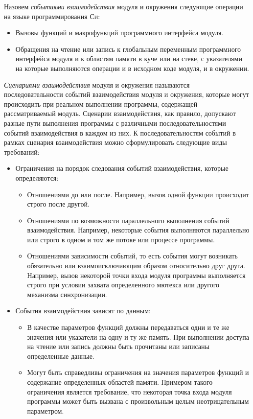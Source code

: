Назовем \textit{событиями взаимодействия} модуля и окружения следующие операции на языке программирования Си:
\begin{itemize}
    \item Вызовы функций и макрофункций программного интерфейса модуля.
    \item Обращения на чтение или запись к глобальным переменным программного интерфейса модуля и к областям памяти в куче или на стеке, с указателями на которые выполняются операции и в исходном коде модуля, и в окружении.
\end{itemize}

\textit{Сценариями взаимодействия} модуля и окружения называются последовательности событий взаимодействия модуля и окружения, которые могут происходить при реальном выполнении программы, содержащей рассматриваемый модуль.
Сценарии взаимодействия, как правило, допускают разные пути выполнения программы с различными последовательностями событий взаимодействия в каждом из них.
К последовательностям событий в рамках сценария взаимодействия можно сформулировать следующие виды требований:
\begin{itemize}
    \item Ограничения на порядок следования событий взаимодействия, которые определяются:
        \begin{itemize}
            \item Отношениями до или после. Например, вызов одной функции происходит строго после другой. 
            \item Отношениями по возможности параллельного выполнения событий взаимодействия. Например, некоторые события выполняются параллельно или строго в одном и том же потоке или процессе программы.
            \item Отношениями зависимости событий, то есть события могут возникать обязательно или взаимоисключающим образом относительно друг друга. Например, вызов некоторой точки входа модуля программы выполняется строго при условии захвата определенного мютекса или другого механизма синхронизации.
        \end{itemize}
    \item События взаимодействия зависят по данным:
        \begin{itemize}
            \item В качестве параметров функций должны передаваться одни и те же значения или указатели на одну и ту же память. При выполнении доступа на чтение или запись должны быть прочитаны или записаны определенные данные.
            \item Могут быть справедливы ограничения на значения параметров функций и содержание определенных областей памяти. 
            Примером такого ограничения является требование, что некоторая точка входа модуля программы может быть вызвана с произвольным целым неотрицательным параметром.
        \end{itemize}
\end{itemize}

